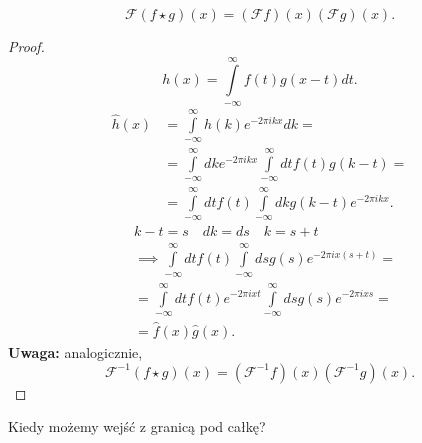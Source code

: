 \documentclass[../main.tex]{subfiles}
\begin{document}
    \begin{stw}
    \[
        \mathcal{F}\left( f\star g \right) (x) = \left( \mathcal{F}f \right) (x) \left( \mathcal{F}g \right) (x)
    .\]
    \end{stw}
\begin{proof}
    \[
        h(x) = \int\limits_{-\infty}^{\infty} f(t)g(x-t)dt
    .\]
\begin{align*}
    \hat{h}(x) &= \int\limits_{-\infty}^{\infty} h(k)e^{-2\pi i kx}dk = \\
    &= \int\limits_{-\infty}^{\infty} dk e^{-2\pi i kx}\int\limits_{-\infty}^{\infty} dt f(t)g(k-t) = \\
    &= \int\limits_{-\infty}^{\infty} dt f(t) \int\limits_{-\infty}^{\infty} dk g(k-t) e^{-2\pi i kx}
    .\end{align*}
    \begin{align*}
    &k-t = s\quad dk = ds\quad k = s+t\\
    &\implies\int\limits_{-\infty}^{\infty} dt f(t)\int\limits_{-\infty}^{\infty} ds g(s) e^{-2\pi i x(s+t)} = \\
    &= \int\limits_{-\infty}^{\infty} dt f(t) e^{-2\pi i xt} \int\limits_{-\infty}^{\infty} ds g(s) e^{-2\pi i xs} = \\
    &= \hat{f}(x) \hat{g}(x)
.\end{align*}
\textbf{Uwaga:} analogicznie,
\[
    \mathcal{F}^{-1}\left( f\star g \right) (x) = \left( \mathcal{F}^{-1}f \right) (x) \left( \mathcal{F}^{-1}g \right) (x)
.\]
\end{proof}
\begin{pytanie}
    Kiedy możemy wejść z granicą pod całkę?
\end{pytanie}
\end{document}
